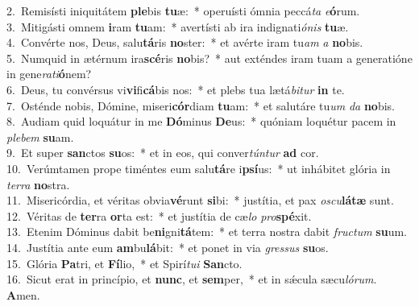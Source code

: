 {2.~}Remisísti iniquitátem \textbf{ple}bis \textbf{tu}æ:~* operuísti ómnia peccá\textit{ta} \textit{e}\textbf{ó}rum.\\
{3.~}Mitigásti omnem \textbf{i}ram \textbf{tu}am:~* avertísti ab ira indignati\textit{ó}\textit{nis} \textbf{tu}æ.\\
{4.~}Convérte nos, Deus, salu\textbf{tá}ris \textbf{no}ster:~* et avérte iram tu\textit{am} \textit{a} \textbf{no}bis.\\
{5.~}Numquid in ætérnum ira\textbf{scé}ris \textbf{no}bis?~* aut exténdes iram tuam a generatióne in gene\textit{ra}\textit{ti}\textbf{ó}nem?\\
{6.~}Deus, tu convérsus vi\textbf{vi}fi\textbf{cá}bis nos:~* et plebs tua lætá\textit{bi}\textit{tur} \textbf{in} te.\\
{7.~}Osténde nobis, Dómine, miseri\textbf{cór}diam \textbf{tu}am:~* et salutáre tu\textit{um} \textit{da} \textbf{no}bis.\\
{8.~}Audiam quid loquátur in me \textbf{Dó}minus \textbf{De}us:~* quóniam loquétur pacem in \textit{ple}\textit{bem} \textbf{su}am.\\
{9.~}Et super \textbf{san}ctos \textbf{su}os:~* et in eos, qui conver\textit{tún}\textit{tur} \textbf{ad} cor.\\
{10.~}Verúmtamen prope timéntes eum salu\textbf{tá}re i\textbf{psí}us:~* ut inhábitet glória in \textit{ter}\textit{ra} \textbf{no}stra.\\
{11.~}Misericórdia, et véritas obvia\textbf{vé}runt \textbf{si}bi:~* justítia, et pax \textit{o}\textit{scu}\textbf{lá}\textbf{tæ} sunt.\\
{12.~}Véritas de \textbf{ter}ra \textbf{or}ta est:~* et justítia de cæ\textit{lo} \textit{pro}\textbf{spé}xit.\\
{13.~}Etenim Dóminus dabit be\textbf{ni}gni\textbf{tá}tem:~* et terra nostra dabit \textit{fru}\textit{ctum} \textbf{su}um.\\
{14.~}Justítia ante eum \textbf{am}bu\textbf{lá}bit:~* et ponet in via \textit{gres}\textit{sus} \textbf{su}os.\\
{15.~}Glória \textbf{Pa}tri, et \textbf{Fí}lio,~* et Spirí\textit{tu}\textit{i} \textbf{San}cto.\\
{16.~}Sicut erat in princípio, et \textbf{nunc}, et \textbf{sem}per,~* et in sǽcula sæcu\textit{ló}\textit{rum}. \textbf{A}men.\\
